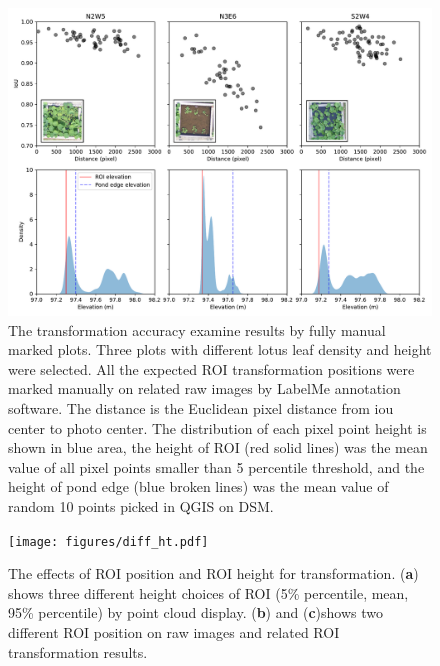 \documentclass[doublespacing]{configs/bmcart}
\begin{document}
\begin{backmatter}
\begin{figure}[!htb]
  \includegraphics[width=0.95\linewidth]{figures/dist.pdf}
  \caption{The transformation accuracy examine results by fully manual marked plots. Three plots with different lotus leaf density and height were selected. All the expected ROI transformation positions were marked manually on related raw images by LabelMe annotation software. The distance is the Euclidean pixel distance from \acrfull*{iou} center to photo center. The distribution of each pixel point height is shown in blue area, the height of ROI (red solid lines) was the mean value of all pixel points smaller than 5 percentile threshold, and the height of pond edge (blue broken lines) was the mean value of random 10 points picked in QGIS on DSM.}
  \label{fig:dist}
\end{figure}

\begin{figure}[!htb]
  \texttt{[image: figures/diff\_ht.pdf]}
  \caption{The effects of ROI position and ROI height for transformation. (\textbf{a}) shows three different height choices of ROI (5\% percentile, mean, 95\% percentile) by point cloud display. (\textbf{b}) and (\textbf{c})shows two different ROI position on raw images and related ROI transformation results.}
  \label{fig:ht_diff}
\end{figure}


\end{backmatter}
\end{document}
